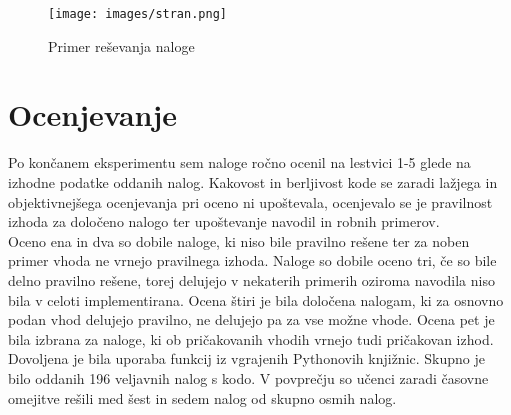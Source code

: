 \documentclass[a4paper,12pt,openright]{book}
\begin{document}
\begin{figure}[H]
    \centering
    \texttt{[image: images/stran.png]}
    \caption{Primer reševanja naloge}
    \label{fig:stran}
\end{figure}


\section{Ocenjevanje}
Po končanem eksperimentu sem naloge ročno ocenil na lestvici 1-5 glede na izhodne podatke oddanih nalog. Kakovost in berljivost kode se zaradi lažjega in objektivnejšega ocenjevanja pri oceno ni upoštevala, ocenjevalo se je pravilnost izhoda za določeno nalogo ter upoštevanje navodil in robnih primerov. \\
Oceno ena in dva so dobile naloge, ki niso bile pravilno rešene ter za noben primer vhoda ne vrnejo pravilnega izhoda. Naloge so dobile oceno tri, če so bile delno pravilno rešene, torej delujejo v nekaterih primerih oziroma navodila niso bila v celoti implementirana. Ocena štiri je bila določena nalogam, ki za osnovno podan vhod delujejo pravilno, ne delujejo pa za vse možne vhode. Ocena pet je bila izbrana za naloge, ki ob pričakovanih vhodih vrnejo tudi pričakovan izhod. Dovoljena je bila uporaba funkcij iz vgrajenih Pythonovih knjižnic.  Skupno je bilo oddanih 196 veljavnih nalog s kodo. V povprečju so učenci zaradi časovne omejitve rešili med šest in sedem nalog od skupno osmih nalog. 
\end{document}
